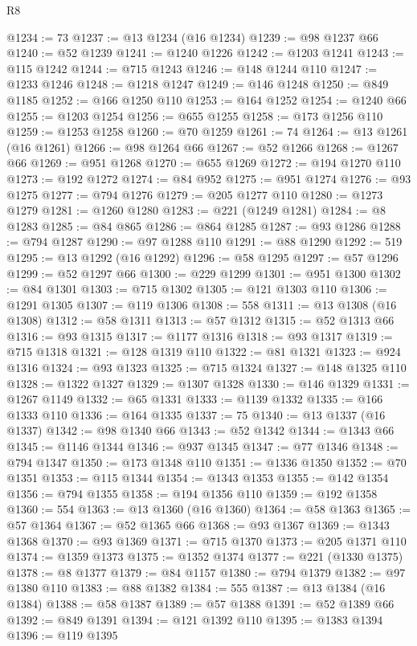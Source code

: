 \begin{lexlean}{R8}
\begin{coremodule}
@1234 := 73
@1237 := @13 @1234 (@16 @1234)
@1239 := @98 @1237 @66
@1240 := @52 @1239
@1241 := @1240 @1226
@1242 := @1203 @1241
@1243 := @115 @1242
@1244 := @715 @1243
@1246 := @148 @1244 @110
@1247 := @1233 @1246
@1248 := @1218 @1247
@1249 := @146 @1248
@1250 := @849 @1185
@1252 := @166 @1250 @110
@1253 := @164 @1252
@1254 := @1240 @66
@1255 := @1203 @1254
@1256 := @655 @1255
@1258 := @173 @1256 @110
@1259 := @1253 @1258
@1260 := @70 @1259
@1261 := 74
@1264 := @13 @1261 (@16 @1261)
@1266 := @98 @1264 @66
@1267 := @52 @1266
@1268 := @1267 @66
@1269 := @951 @1268
@1270 := @655 @1269
@1272 := @194 @1270 @110
@1273 := @192 @1272
@1274 := @84 @952
@1275 := @951 @1274
@1276 := @93 @1275
@1277 := @794 @1276
@1279 := @205 @1277 @110
@1280 := @1273 @1279
@1281 := @1260 @1280
@1283 := @221 (@1249 @1281)
@1284 := @8 @1283
@1285 := @84 @865
@1286 := @864 @1285
@1287 := @93 @1286
@1288 := @794 @1287
@1290 := @97 @1288 @110
@1291 := @88 @1290
@1292 := 519
@1295 := @13 @1292 (@16 @1292)
@1296 := @58 @1295
@1297 := @57 @1296
@1299 := @52 @1297 @66
@1300 := @229 @1299
@1301 := @951 @1300
@1302 := @84 @1301
@1303 := @715 @1302
@1305 := @121 @1303 @110
@1306 := @1291 @1305
@1307 := @119 @1306
@1308 := 558
@1311 := @13 @1308 (@16 @1308)
@1312 := @58 @1311
@1313 := @57 @1312
@1315 := @52 @1313 @66
@1316 := @93 @1315
@1317 := @1177 @1316
@1318 := @93 @1317
@1319 := @715 @1318
@1321 := @128 @1319 @110
@1322 := @81 @1321
@1323 := @924 @1316
@1324 := @93 @1323
@1325 := @715 @1324
@1327 := @148 @1325 @110
@1328 := @1322 @1327
@1329 := @1307 @1328
@1330 := @146 @1329
@1331 := @1267 @1149
@1332 := @65 @1331
@1333 := @1139 @1332
@1335 := @166 @1333 @110
@1336 := @164 @1335
@1337 := 75
@1340 := @13 @1337 (@16 @1337)
@1342 := @98 @1340 @66
@1343 := @52 @1342
@1344 := @1343 @66
@1345 := @1146 @1344
@1346 := @937 @1345
@1347 := @77 @1346
@1348 := @794 @1347
@1350 := @173 @1348 @110
@1351 := @1336 @1350
@1352 := @70 @1351
@1353 := @115 @1344
@1354 := @1343 @1353
@1355 := @142 @1354
@1356 := @794 @1355
@1358 := @194 @1356 @110
@1359 := @192 @1358
@1360 := 554
@1363 := @13 @1360 (@16 @1360)
@1364 := @58 @1363
@1365 := @57 @1364
@1367 := @52 @1365 @66
@1368 := @93 @1367
@1369 := @1343 @1368
@1370 := @93 @1369
@1371 := @715 @1370
@1373 := @205 @1371 @110
@1374 := @1359 @1373
@1375 := @1352 @1374
@1377 := @221 (@1330 @1375)
@1378 := @8 @1377
@1379 := @84 @1157
@1380 := @794 @1379
@1382 := @97 @1380 @110
@1383 := @88 @1382
@1384 := 555
@1387 := @13 @1384 (@16 @1384)
@1388 := @58 @1387
@1389 := @57 @1388
@1391 := @52 @1389 @66
@1392 := @849 @1391
@1394 := @121 @1392 @110
@1395 := @1383 @1394
@1396 := @119 @1395

\end{coremodule}
\end{lexlean}
